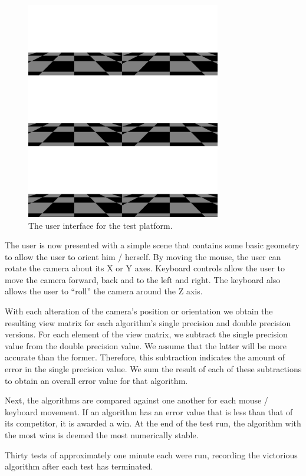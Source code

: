 \documentclass{acm_proc_article-sp}
\begin{document}
\begin{figure}
\includegraphics[width=8.5cm]{user_interface.png}
\caption{The user interface for the test platform.}
\end{figure}

The user is now presented with a simple scene that contains some basic geometry to allow the user to orient him / herself.
By moving the mouse, the user can rotate the camera about its X or Y axes.
Keyboard controls allow the user to move the camera forward, back and to the left and right.
The keyboard also allows the user to ``roll'' the camera around the Z axis.

With each alteration of the camera's position or orientation we obtain the resulting view matrix for each algorithm's single precision and double precision versions.
For each element of the view matrix, we subtract the single precision value from the double precision value.
We assume that the latter will be more accurate than the former.
Therefore, this subtraction indicates the amount of error in the single precision value.
We sum the result of each of these subtractions to obtain an overall error value for that algorithm.

Next, the algorithms are compared against one another for each mouse / keyboard movement.
If an algorithm has an error value that is less than that of its competitor, it is awarded a win.
At the end of the test run, the algorithm with the most wins is deemed the most numerically stable.

Thirty tests of approximately one minute each were run, recording the victorious algorithm after each test has terminated.
\end{document}
